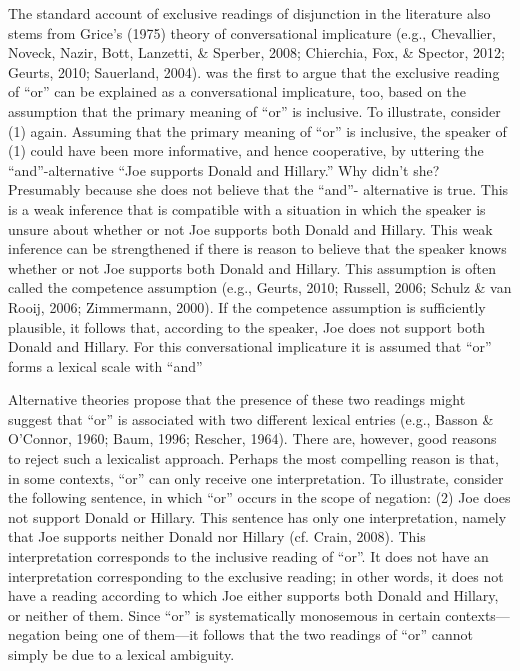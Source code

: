 \documentclass{sp}
\begin{document}
The standard account of exclusive readings of disjunction in the literature also stems from Grice’s (1975) theory of conversational implicature (e.g., Chevallier, Noveck, Nazir, Bott, Lanzetti, \& Sperber, 2008; Chierchia, Fox, \& Spector, 2012; Geurts, 2010; Sauerland, 2004). 
\citet{horn1972semantic} was the first to argue that the exclusive reading of “or” can be explained as a conversational implicature, too, based on the assumption that the primary meaning of “or” is inclusive. To illustrate, consider (1) again. Assuming that the primary
meaning of “or” is inclusive, the speaker of (1) could have been more informative,
and hence cooperative, by uttering the “and”-alternative “Joe supports Donald
and Hillary.” Why didn’t she? Presumably because she does not believe that the “and”-
alternative is true. This is a weak inference that is compatible with a situation in which
the speaker is unsure about whether or not Joe supports both Donald and Hillary. This
weak inference can be strengthened if there is reason to believe that the speaker knows
whether or not Joe supports both Donald and Hillary. This assumption is often called
the competence assumption (e.g., Geurts, 2010; Russell, 2006; Schulz \& van Rooij,
2006; Zimmermann, 2000). If the competence assumption is sufficiently plausible, it
follows that, according to the speaker, Joe does not support both Donald and Hillary.
For this conversational implicature it is assumed that “or” forms a lexical scale with “and” %

Alternative theories propose that the presence of these two readings might suggest that “or” is associated with two
different lexical entries (e.g., Basson \& O’Connor, 1960; Baum, 1996; Rescher, 1964).
There are, however, good reasons to reject such a lexicalist approach. Perhaps the most
compelling reason is that, in some contexts, “or” can only receive one interpretation.
To illustrate, consider the following sentence, in which “or” occurs in the scope of
negation: (2) Joe does not support Donald or Hillary.
This sentence has only one interpretation, namely that Joe supports neither Donald nor
Hillary (cf. Crain, 2008). This interpretation corresponds to the inclusive reading of
“or”. It does not have an interpretation corresponding to the exclusive reading; in other
words, it does not have a reading according to which Joe either supports both Donald
and Hillary, or neither of them. Since “or” is systematically monosemous in certain
contexts—negation being one of them—it follows that the two readings of “or” cannot
simply be due to a lexical ambiguity.
\end{document}
